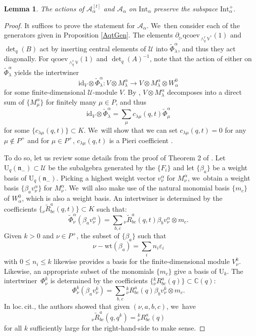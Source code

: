 \documentclass[JEP,XML,SOM,Unicode,published]{cedram}
\let\epsilon\varepsilon
\newcommand{\rU}{\mathrm{U}}
\newtheorem{lem}[thm]{Lemma}
\theoremstyle{definition}
\newcommand{\CC}{\mathbb{C}}
\newcommand{\UU}{\mathcal{U}}
\newcommand{\AAA}{\mathcal{A}}
\begin{document}
\begin{lem}
The actions of $\AAA_\alpha^{[t]}$ and $\AAA_\alpha$ on $\mathrm{Int}_\alpha$ preserve the subspace $\mathrm{Int}_\alpha^+$.
\end{lem}

\begin{proof}
It suffices to prove the statement for $\AAA_\alpha$. We~then consider each of the generators given in Proposition \ref{AqtGen}.
The elements $\partial_\triangleright\mathrm{qcoev}_{\wedge_q^r\mathbb{V}^*}(1)$ and $\det_q(B)$ act by inserting central elements of $\UU$ into $\widetilde{\Phi}_\lambda^\alpha$, and thus they act diagonally.
For $\mathrm{qcoev}_{\wedge^r_q\mathbb{V}}(1)$ and $\det_q(A)^{-1}$, note that the action of either on $\widetilde{\Phi}_\lambda^\alpha$ yields the intertwiner
\[
\mathrm{id}_V\otimes\widetilde{\Phi}_\lambda^\alpha: V\otimes M_\lambda^\alpha\to V\otimes M_\lambda^\alpha\otimes W_\alpha^0
\]
for some finite-dimensional $\UU$-module $V$.
By \cite[Lem.\,5]{BGGHWt}, $V\otimes M_\lambda^\alpha$ decomposes into a direct sum of $\{M_\mu^\alpha\}$ for finitely many $\mu\in P$, and thus
\[
\mathrm{id}_V\otimes\widetilde{\Phi}_\lambda^\alpha=\sum_{\mu}c_{\lambda\mu}(q,t)\widetilde{\Phi}_\mu^\alpha
\]
for some $\{c_{\lambda\mu}(q,t)\}\subset K$. We~will show that we can set $c_{\lambda\mu}(q,t)=0$ for any $\mu\not\in P^+$ and for $\mu\in P^+$, $c_{\lambda\mu}(q,t)$ is a Pieri coefficient \cite[VI.6]{MacBook}.

To do so, let us review some details from the proof of Theorem 2 of \cite{EtKirQuant}.
Let $\rU_q(\mathfrak{n}_-)\subset\UU$ be the subalgebra generated by the $\{F_i\}$ and let $\{\beta_a\}$ be a weight basis of $\rU_q(\mathfrak{n}_-)$.
Picking a highest weight vector $v_\nu^\alpha$ for $M_\nu^\alpha$, we~obtain a weight basis $\{\beta_a v_\nu^\alpha\}$ for $M_\nu^\alpha$. We~will also make use of the natural monomial basis $\{m_c\}$ of $W_\alpha^0$, which is also a weight basis.
An intertwiner is determined by the coefficients $\{ {}_\nu\widetilde{R}_{bc}^a(q,t)\}\subset K$ such that:
\[
\widetilde{\Phi}_\nu^\alpha(\beta_a v_\nu^\alpha)=\sum_{b,c}{}_\nu\widetilde{R}_{bc}^a(q,t)\beta_b v_\nu^\alpha\otimes m_c.
\]
Given $k>0$ and $\nu\in P^+$, the subset of $\{\beta_a\}$ such that
\[
\nu-\mathrm{wt}(\beta_a)=\sum_{i}n_i\epsilon_i
\]
with $0\le n_i\le k$ likewise provides a basis for the finite-dimensional module $V_\nu^k$.
Likewise, an appropriate subset of the monomials $\{m_c\}$ give a basis of $\rU_k$.
The intertwiner~$\Phi_\nu^k$ is determined by the coefficients $\{ {}_\nu^kR_{bc}^a(q)\}\subset\CC(q)$:
\[
\Phi_\nu^k(\beta_a v_\nu^k)=\sum_{b,c}{}_\nu^k R_{bc}^a(q)\beta_b v_\nu^k\otimes m_c.
\]
In loc.\,cit., the authors showed that given $(\nu, a, b, c)$, we~have
\[
{}_\nu\widetilde{R}_{bc}^a(q,q^k)= {}_\nu^kR_{bc}^a(q)
\]
for all $k$ sufficiently large for the right-hand-side to make sense.


\end{proof}
\end{document}
